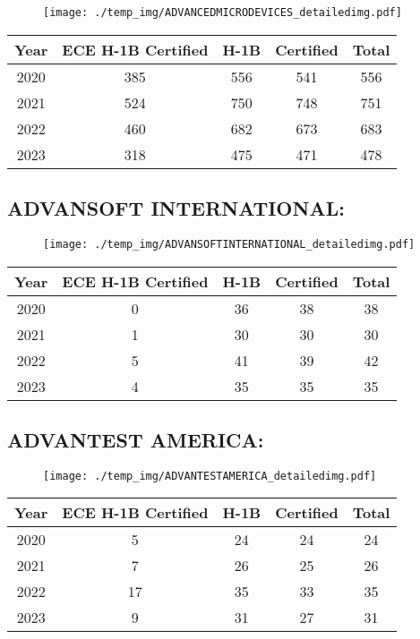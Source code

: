 \documentclass{article}%
\begin{document}
\begin{figure}[htbp]%
\centering%
\texttt{[image: ./temp\_img/ADVANCEDMICRODEVICES\_detailedimg.pdf]}%
\end{figure}

%
\begin{longtable}{c|c|c|c|c}%
\hline%
Year&ECE H{-}1B Certified&H{-}1B&Certified&Total\\%
\hline%
2020&385&556&541&556\\%
\hline%
2021&524&750&748&751\\%
\hline%
2022&460&682&673&683\\%
\hline%
2023&318&475&471&478\\%
\hline%
\end{longtable}

%
\newpage%
\subsection{ADVANSOFT INTERNATIONAL:}%
\label{subsec:ADVANSOFTINTERNATIONAL}%
\label{ADVANSOFTINTERNATIONALdetailed}%


\begin{figure}[htbp]%
\centering%
\texttt{[image: ./temp\_img/ADVANSOFTINTERNATIONAL\_detailedimg.pdf]}%
\end{figure}

%
\begin{longtable}{c|c|c|c|c}%
\hline%
Year&ECE H{-}1B Certified&H{-}1B&Certified&Total\\%
\hline%
2020&0&36&38&38\\%
\hline%
2021&1&30&30&30\\%
\hline%
2022&5&41&39&42\\%
\hline%
2023&4&35&35&35\\%
\hline%
\end{longtable}

%
\newpage%
\subsection{ADVANTEST AMERICA:}%
\label{subsec:ADVANTESTAMERICA}%
\label{ADVANTESTAMERICAdetailed}%


\begin{figure}[htbp]%
\centering%
\texttt{[image: ./temp\_img/ADVANTESTAMERICA\_detailedimg.pdf]}%
\end{figure}

%
\begin{longtable}{c|c|c|c|c}%
\hline%
Year&ECE H{-}1B Certified&H{-}1B&Certified&Total\\%
\hline%
2020&5&24&24&24\\%
\hline%
2021&7&26&25&26\\%
\hline%
2022&17&35&33&35\\%
\hline%
2023&9&31&27&31\\%
\hline%
\end{longtable}
\end{document}
